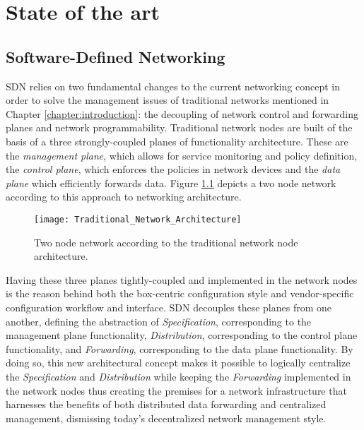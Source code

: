 
\chapter{State of the art}
\label{chapter:state-of-the-art}
%
\section{Software-Defined Networking}
\label{section:software-defined-network}
\gls{SDN} relies on two fundamental changes to the current networking concept in order to solve the management issues of traditional networks mentioned in Chapter \ref{chapter:introduction}: the decoupling of network control and forwarding planes and network programmability\cite{OFWP}.
% 
Traditional network nodes are built of the basis of a three strongly-coupled planes of functionality architecture.
These are the \emph{management plane}, which allows for service monitoring and policy definition, the \emph{control plane}, which enforces the policies in network devices and the \emph{data plane} which efficiently forwards data.
Figure \ref{fig:Traditional_Network_Architecture} depicts a two node network according to this approach to networking architecture.\\
\begin{figure}
	\centering
	\texttt{[image: Traditional\_Network\_Architecture]}
	\caption{Two node network according to the traditional network node architecture.}
	\label{fig:Traditional_Network_Architecture}
\end{figure}
%
Having these three planes tightly-coupled and implemented in the network nodes is the reason behind both the box-centric configuration style and vendor-specific configuration workflow and interface.
\gls{SDN} decouples these planes from one another, defining the abstraction of \emph{Specification}, corresponding to the management plane functionality, \emph{Distribution}, corresponding to the control plane functionality, and \emph{Forwarding}, corresponding to the data plane functionality.
By doing so, this new architectural concept makes it possible to logically centralize the \emph{Specification} and \emph{Distribution} while keeping the \emph{Forwarding} implemented in the network nodes\cite{Kreutz2014,OFWP,OpenNetworkingFoundation} thus creating the premises for a network infrastructure that harnesses the benefits of both distributed data forwarding and centralized management, dismissing today's decentralized network management style.\\
